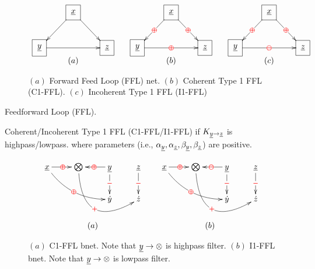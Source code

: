 \begin{figure}
$$
\begin{array}{ccccc}
\xymatrix{
&\Rect{\rvx}\ar[dl]
\ar[dr]
\\
\Rect{\rvy}\ar[rr]
&&\Rect{\rvz}
}&
&
\xymatrix{
&\Rect{\rvx}\ar[dl]|\redoplus
\ar[dr]|\redoplus
\\
\Rect{\rvy}\ar[rr]|\redoplus
&&\Rect{\rvz}
}
&
&
\xymatrix{
&\Rect{\rvx}\ar[dl]|\redoplus
\ar[dr]|\redoplus
\\
\Rect{\rvy}\ar[rr]|\redominus
&&\Rect{\rvz}
}
\\
(a)
&&(b)
&&(c)
\end{array}
$$
\caption{$(a)$ Forward Feed Loop (FFL) net.
$(b)$ Coherent Type 1 FFL (C1-FFL).
$(c)$ Incoherent Type 1 FFL (I1-FFL)}

\end{figure}










Feedforward Loop (FFL).

Coherent/Incoherent Type 1 FFL (C1-FFL/I1-FFL) if $K_{\rvy\rarrow\rvz}$ is highpass/lowpass.
where parameters (i.e., $\alp_\rvy, \alp_\rvz, \beta_\rvy, \beta_{\rvz}$) are positive.

\begin{figure}[h!]
$$
\begin{array}{ccc}
\xymatrix{
\rvx \ar@/_1pc/[drr]|\redoplus
\ar[r]|\redoplus
&\bigotimes\ar@/_3pc/[drr]|{\redplus}
& \rvy\ar[d]|{\redminus}\ar[l]|
\redoplus
&\rvz\ar[d]|{\redminus}
\\
&
& \dot{y}
&
\dot{z} 
}
&&
\xymatrix{
\rvx \ar@/_1pc/[drr]|\redoplus\ar[r]|\redoplus
&\bigotimes\ar@/_3pc/[drr]|{\redplus}
& \rvy\ar[d]|{\redminus}\ar[l]|
\redominus
&\rvz\ar[d]|{\redminus}
\\
&
& \dot{y}
&
\dot{z} 
}
\\
\\
(a)&&(b)
\end{array}
$$
\caption{$(a)$ C1-FFL bnet.
Note that $\rvy\rarrow \otimes$
is highpass filter.
$(b)$ I1-FFL bnet. Note that $\rvy\rarrow \otimes$
is lowpass filter.
}
\label{fig-bnet-c1-ffl}
\end{figure}


